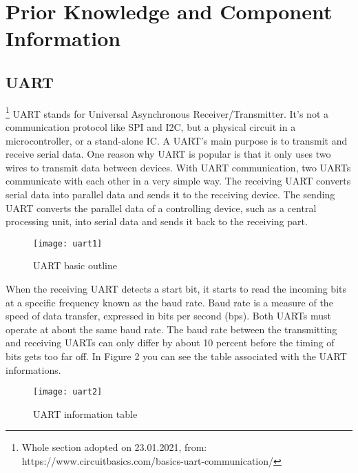 \documentclass[11pt]{scrartcl}
\begin{document}
	
	\newpage
	\section{Prior Knowledge and Component Information}
	\subsection{UART}
		\footnote{\label{foot:1}Whole section adopted on 23.01.2021, from: https://www.circuitbasics.com/basics-uart-communication/} 
UART stands for Universal Asynchronous Receiver/Transmitter. It’s not a communication protocol like SPI and I2C, but a physical circuit in a microcontroller, or a stand-alone IC. A UART’s main purpose is to transmit and receive serial data.
One reason why UART is popular is that it only uses two wires to transmit data between devices.
\newline\newline
With UART communication, two UARTs communicate with each other in a very simple way. The receiving UART converts serial data into parallel data and sends it to the receiving device. The sending UART converts the parallel data of a controlling device, such as a central processing unit, into serial data and sends it back to the receiving part.
	\begin{figure}[h]
		\centering
		\texttt{[image: uart1]}
		\caption{UART basic outline}
	\end{figure}	\newline
When the receiving UART detects a start bit, it starts to read the incoming bits at a specific frequency known as the baud rate. Baud rate is a measure of the speed of data transfer, expressed in bits per second (bps). Both UARTs must operate at about the same baud rate. The baud rate between the transmitting and receiving UARTs can only differ by about 10 percent before the timing of bits gets too far off. In Figure 2 you can see the table associated with the UART informations.
	\begin{figure}[h]
		\centering
		\texttt{[image: uart2]}
		\caption{UART information table}
	\end{figure}	
	
\end{document}
